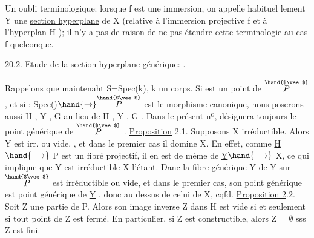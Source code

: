 
\margin{$|$}Un oubli terminologique: lorsque f est une immersion, on appelle habituel%
lement Y\hand{$_\xi$} une \uline{section hyperplane} de X (relative à l'immersion projective
f et à l'hyperplan H  ); il n'y a pas de raison de ne pas étendre cette
terminologie au cas f quelconque.

20.2. \uline{Etude de la section hyperplane générique}:  .

Rappelons que maintenaht S=Spec(k), k un corps. Si \hand{$\eta$} est un point
de $\overset{\hand{$\vee$}}{P}$ ,  et si \hand{$\xi$}: Spec(\hand{$\eta$})$\hand{\to}\overset{\hand{$\vee$}}{P}$ est le morphisme canonique, nous poserons
aussi H\hand{$_\eta$} , Y\hand{$_\eta$} , G\hand{$_\eta$} au lieu de H\hand{$_\xi$} , Y\hand{$_\xi$} , G\hand{$_\xi$} . Dans le présent nº, \hand{$\eta$}
désignera toujours le point générique de $\overset{\hand{$\vee$}}{P}$ .
\uline{Proposition} 2.1. Supposons X irréductible. Alors Y\hand{$_\eta$} est irr.  ou vide. ,
et dans le premier cas il domine X. 
En effet, comme \uline{H}$\hand{\longrightarrow}$ P est un fibré projectif, il en est de même de
\uline{Y}$\hand{\longrightarrow}$ X, ce qui implique que \uline{Y} est irréductible X l'étant. Danc la fibre
générique Y   de \uline{Y} sur $\overset{\hand{$\vee$}}{P}$ est irréductible ou vide, et dans le premier cas,
son point générique est point générique de \uline{Y} , donc au dessus de celui de
X, cqfd.
\uline{Proposition 2}.2. Soit Z une partie de P. Alors son image inverse Z\hand{$_\eta$} dans
H\hand{$_\eta$} est vide si et seulement si tout point de Z est fermé. En particulier,
si Z est constructible, alors Z\hand{$_\eta$} = $\emptyset$ sss Z est fini.


